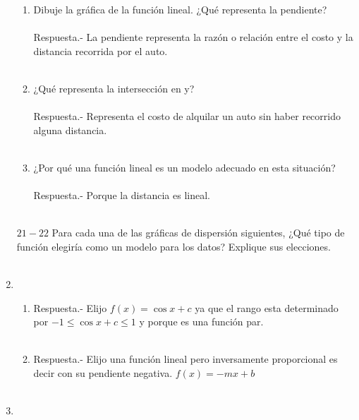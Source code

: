 \begin{enumerate}
\begin{enumerate}[\bfseries (a)]
	\item Dibuje la gráfica de la función lineal. ¿Qué representa la pendiente?\\\\
	    Respuesta.-\; La pendiente representa la razón o relación entre el costo y la distancia recorrida por el auto.\\\\

	\item ¿Qué representa la intersección en y?\\\\
	    Respuesta.-\; Representa el costo de alquilar un auto sin haber recorrido alguna distancia.\\\\

	\item ¿Por qué una función lineal es un modelo adecuado en esta situación?\\\\
	    Respuesta.-\; Porque la distancia es lineal.\\\\

    \end{enumerate}

    $21-22$ Para cada una de las gráficas de dispersión siguientes, ¿Qué tipo de función elegiría como un modelo para los datos? Explique sus elecciones.\\\\

    \item
    \begin{enumerate}[\bfseries (a)]

	\item  Respuesta.-\; Elijo $f(x) = \cos x + c$ ya que el rango esta determinado por $-1 \leq \cos x + c \leq 1$ y porque es una función par.\\\\

	\item Respuesta.-\; Elijo una función lineal pero inversamente proporcional es decir con su pendiente negativa. $f(x)=-mx + b$\\\\

    \end{enumerate}

    \item 
    \begin{enumerate}[\bfseries (a)]
	

\end{enumerate}
\end{enumerate}
